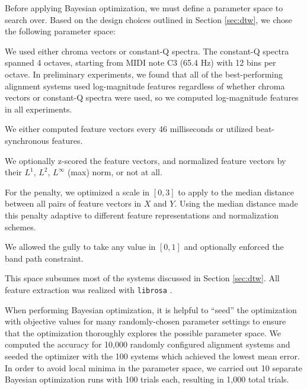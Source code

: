 \documentclass{article}
\begin{document}
Before applying Bayesian optimization, we must define a parameter space to search over.
Based on the design choices outlined in Section \ref{sec:dtw}, we chose the following parameter space:
\begin{description}[topsep=1pt,itemsep=-1pt,leftmargin=5pt]
\item[Feature representation:] We used either chroma vectors or constant-Q spectra.
The constant-Q spectra spanned 4 octaves, starting from MIDI note C3 (65.4 Hz) with 12 bins per octave.
In preliminary experiments, we found that all of the best-performing alignment systems used log-magnitude features regardless of whether chroma vectors or constant-Q spectra were used, so we computed log-magnitude features in all experiments.
\item[Time scale:] We either computed feature vectors every 46 milliseconds or utilized beat-synchronous features.
\item[Normalization:] We optionally z-scored the feature vectors, and normalized feature vectors by their $L^1$, $L^2$, $L^\infty$ (max) norm, or not at all.
\item[Penalty:] For the penalty, we optimized a scale in $[0, 3]$ to apply to the median distance between all pairs of feature vectors in $X$ and $Y$.
Using the median distance made this penalty adaptive to different feature representations and normalization schemes.
\item[Gully and band path constraint:] We allowed the gully to take any value in $[0, 1]$ and optionally enforced the band path constraint.
\end{description}
This space subsumes most of the systems discussed in Section \ref{sec:dtw}.
All feature extraction was realized with \texttt{librosa} \cite{mcfee2015librosa, mcfee2015librosa_scipy}.

When performing Bayesian optimization, it is helpful to ``seed'' the optimization with objective values for many randomly-chosen parameter settings to ensure that the optimization thoroughly explores the possible parameter space.
We computed the accuracy for 10,000 randomly configured alignment systems and seeded the optimizer with the 100 systems which achieved the lowest mean error.
In order to avoid local minima in the parameter space, we carried out 10 separate Bayesian optimization runs with 100 trials each, resulting in 1,000 total trials.
\end{document}
